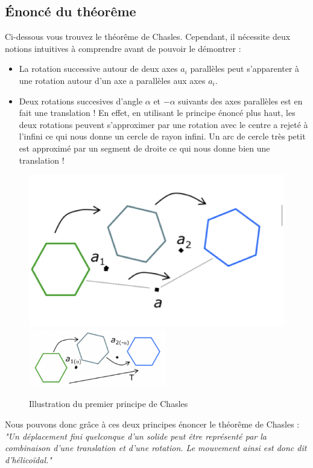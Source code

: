 \subsection{Énoncé du théorême}

Ci-dessous vous trouvez le théorême de Chasles. Cependant, il nécessite deux notions intuitives à comprendre avant de pouvoir le démontrer : \\
\begin{itemize}
    \item La rotation successive autour de deux axes $a_i$ parallèles peut s'apparenter à une rotation autour d'un axe a parallèles aux axes $a_i$.
    \item Deux rotations succesives d'angle $\alpha$ et $-\alpha$ suivants des axes parallèles est en fait une translation ! En effet, en utilisant le principe énoncé plus haut, les deux rotations peuvent s'approximer par une rotation avec le centre a rejeté à l'infini ce qui nous donne un cercle de rayon infini. Un arc de cercle très petit est approximé par un segment de droite ce qui nous donne bien une translation !
\end{itemize}
\begin{figure}[H]
    \centering
    \includegraphics[width = 60 mm]{Images/imagesCinematique/Figure chasles 1.png}
    \includegraphics[width=60mm]
    {Images/imagesCinematique/Figure Chasles 2.png}
    \caption{Illustration du premier principe de Chasles}
    \label{fig:my_label}
\end{figure}
Nous pouvons donc grâce à ces deux principes énoncer le théorême de Chasles :\\

\textit{"Un déplacement fini quelconque d'un solide peut être représenté par la combinaison d'une translation et d'une rotation. Le mouvement ainsi est donc dit d'hélicoïdal."}

